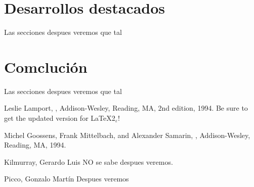 \documentclass[%
	draft,
%
	notitlepage,
	narroweqnarray,
	inline,
	twoside,
	]{ieee}
\newcommand{\latexiie}{\LaTeX2{\Large$_\varepsilon$}}
\begin{document}
\section{Desarrollos destacados}
Las secciones despues veremos que tal

\section{Comcluci\'on}
Las secciones despues veremos que tal


\begin{thebibliography}{1}

Leslie Lamport,
,
\newblock Addison-Wesley, Reading, MA, 2nd edition, 1994.
\newblock Be sure to get the updated version for \latexiie!

Michel Goossens, Frank Mittelbach, and Alexander Samarin,
,
\newblock Addison-Wesley, Reading, MA, 1994.

\end{thebibliography}


\begin{biography}{Kilmurray, Gerardo Luis} 
NO se sabe despues veremos.
\end{biography}


\begin{biography}{Picco, Gonzalo Mart\'in} 
Despues veremos
\end{biography}
\end{document}
